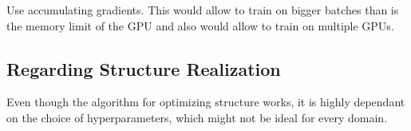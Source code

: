 Use accumulating gradients. This would allow to train on bigger batches than is the memory limit of the GPU and also would allow to train on multiple GPUs.

\subsection{Regarding Structure Realization}

Even though the algorithm for optimizing structure works, it is highly dependant on the choice of hyperparameters, which might not be ideal for every domain. 